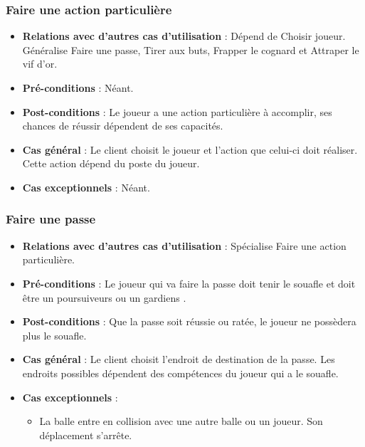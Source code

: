\documentclass[a4paper,titlepage]{scrreprt}
\begin{document}
    \subsubsection{Faire une action particulière}
      \begin{itemize}
        \item \textbf{Relations avec d'autres cas d'utilisation}  : Dépend de Choisir joueur. Généralise Faire une passe, Tirer aux buts, Frapper le cognard et Attraper le vif d'or.
        \item \textbf{Pré-conditions} : Néant.
        \item \textbf{Post-conditions} : Le joueur a une action particulière à accomplir, ses chances de réussir dépendent de ses capacités.
        \item \textbf{Cas général} : Le client choisit le joueur et l’action que celui-ci doit réaliser. Cette action dépend du poste du joueur.
        \item \textbf{Cas exceptionnels} : Néant.
      \end{itemize}

    \subsubsection{Faire une passe}
      \begin{itemize}
        \item \textbf{Relations avec d'autres cas d'utilisation}  : Spécialise Faire une action particulière.
        \item \textbf{Pré-conditions} : Le joueur qui va faire la passe doit tenir le \gls{souafle} et doit être un \gls{poursuiveur}s  ou un \gls{gardien}s .
        \item \textbf{Post-conditions} : Que la passe soit réussie ou ratée, le joueur ne possèdera plus le souafle.
        \item \textbf{Cas général} : Le client choisit l’endroit de destination de la passe. Les endroits possibles dépendent des compétences du joueur qui a le souafle. %
        \item \textbf{Cas exceptionnels} :
        \begin{itemize}
            \item La balle entre en collision avec une autre balle ou un joueur. Son déplacement s'arrête.
        \end{itemize}
      \end{itemize}
\end{document}
